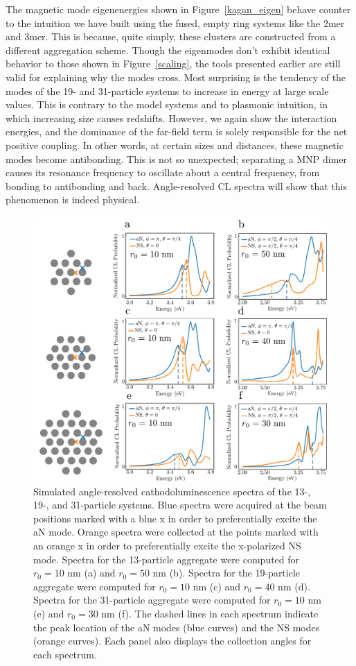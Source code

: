 \documentclass[journal=apchd5,manuscript=article]{achemso}
\begin{document}
The magnetic mode eigenenergies shown in Figure~\ref{kagan_eigen} behave counter to the intuition we have built using the fused, empty ring systems like the 2mer and 3mer. This is because, quite simply, these clusters are constructed from a different aggregation scheme. Though the eigenmodes don't exhibit identical behavior to those shown in Figure~\ref{scaling}, the tools presented earlier are still valid for explaining why the modes cross. Most surprising is the tendency of the modes of the 19- and 31-particle systems to increase in energy at large scale values. This is contrary to the model systems and to plasmonic intuition, in which increasing size causes redshifts. However, we again show the interaction energies, and the dominance of the far-field term is solely responsible for the net positive coupling. In other words, at certain sizes and distances, these magnetic modes become antibonding. This is not so unexpected; separating a MNP dimer causes its resonance frequency to oscillate about a central frequency, from bonding to antibonding and back\cite{vonPlessen2007}. Angle-resolved CL spectra will show that this phenomenon is indeed physical.

\begin{figure}
\includegraphics[width=6in]{kagan_CL_spectra.pdf}
\caption{Simulated angle-resolved cathodoluminescence spectra of the 13-, 19-, and 31-particle systems. Blue spectra were acquired at the beam positions marked with a blue x in order to preferentially excite the aN mode. Orange spectra were collected at the points marked with an orange x in order to preferentially excite the x-polarized NS mode. Spectra for the 13-particle aggregate were computed for $r_0 = 10$ nm (a) and $r_0 = 50$ nm (b). Spectra for the 19-particle aggregate were computed for $r_0 = 10$ nm (c) and $r_0 = 40$ nm (d). Spectra for the 31-particle aggregate were computed for $r_0 = 10$ nm (e) and $r_0 = 30$ nm (f). The dashed lines in each spectrum indicate the peak location of the aN modes (blue curves) and the NS modes (orange curves). Each panel also displays the collection angles for each spectrum.}
\label{kagan_CL}
\end{figure}
\end{document}
